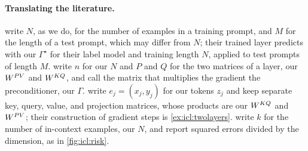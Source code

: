 \begin{refsection}
\paragraph{Translating the literature.} \Textcite{ZhangFreiBartlett2024} write $N$, as we do, for the number of examples in a training prompt, and $M$ for the length of a test prompt, which may differ from $N$; their trained layer predicts with our $\Gamma^\star$ for their label model and training length $N$, applied to test prompts of length $M$. \Textcite{AhnEtAl2023} write $n$ for our $N$ and $P$ and $Q$ for the two matrices of a layer, our $W^{PV}$ and $W^{KQ}$, and call the matrix that multiplies the gradient the preconditioner, our $\Gamma$. \Textcite{VonOswaldEtAl2023} write $e_j=(x_j,y_j)$ for our tokens $z_j$ and keep separate key, query, value, and projection matrices, whose products are our $W^{KQ}$ and $W^{PV}$; their construction of gradient steps is \cref{ex:icl:twolayers}. \Textcite{GargEtAl2022} write $k$ for the number of in-context examples, our $N$, and report squared errors divided by the dimension, as in \cref{fig:icl:risk}.

\printchapterbib
\end{refsection}
